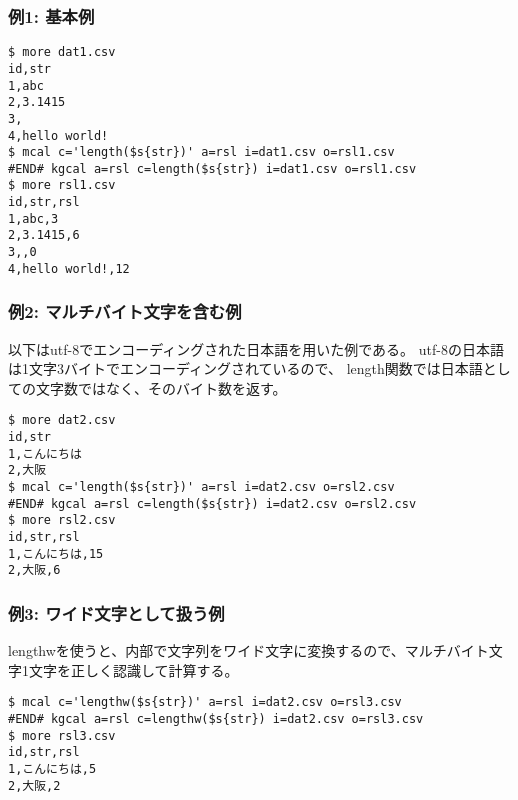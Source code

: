 \subsubsection*{例1: 基本例}



\begin{Verbatim}[baselinestretch=0.7,frame=single]
$ more dat1.csv
id,str
1,abc
2,3.1415
3,
4,hello world!
$ mcal c='length($s{str})' a=rsl i=dat1.csv o=rsl1.csv
#END# kgcal a=rsl c=length($s{str}) i=dat1.csv o=rsl1.csv
$ more rsl1.csv
id,str,rsl
1,abc,3
2,3.1415,6
3,,0
4,hello world!,12
\end{Verbatim}
\subsubsection*{例2: マルチバイト文字を含む例}

以下はutf-8でエンコーディングされた日本語を用いた例である。
utf-8の日本語は1文字3バイトでエンコーディングされているので、
length関数では日本語としての文字数ではなく、そのバイト数を返す。


\begin{Verbatim}[baselinestretch=0.7,frame=single]
$ more dat2.csv
id,str
1,こんにちは
2,大阪
$ mcal c='length($s{str})' a=rsl i=dat2.csv o=rsl2.csv
#END# kgcal a=rsl c=length($s{str}) i=dat2.csv o=rsl2.csv
$ more rsl2.csv
id,str,rsl
1,こんにちは,15
2,大阪,6
\end{Verbatim}
\subsubsection*{例3: ワイド文字として扱う例}

lengthwを使うと、内部で文字列をワイド文字に変換するので、マルチバイト文字1文字を正しく認識して計算する。


\begin{Verbatim}[baselinestretch=0.7,frame=single]
$ mcal c='lengthw($s{str})' a=rsl i=dat2.csv o=rsl3.csv
#END# kgcal a=rsl c=lengthw($s{str}) i=dat2.csv o=rsl3.csv
$ more rsl3.csv
id,str,rsl
1,こんにちは,5
2,大阪,2
\end{Verbatim}
